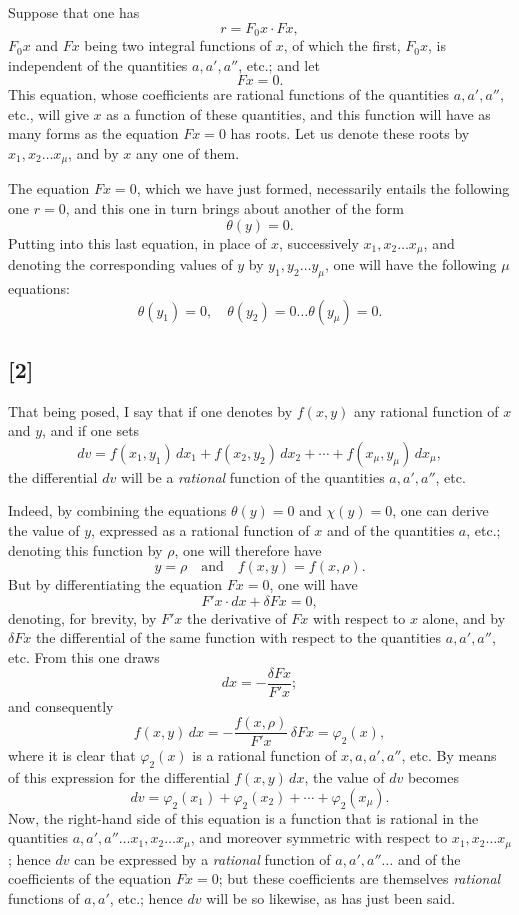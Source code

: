 \documentclass{article}
\begin{document}
Suppose that one has
\[ r = F_{0} x \cdot F x, \tag{4} \]
$F_0 x$ and $F x$ being two integral functions of $x$, of which the first, $F_0 x$, is independent of the quantities $a, a', a''$, etc.; and let
\[ F x = 0. \tag{5} \]
This equation, whose coefficients are rational functions of the quantities $a, a', a''$, etc., will give $x$ as a function of these quantities, and this function will have as many forms as the equation $F x = 0$ has roots. Let us denote these roots by $x_1, x_2 \ldots x_\mu$, and by $x$ any one of them.

The equation $F x = 0$, which we have just formed, necessarily entails the following one $r = 0$, and this one in turn brings about another of the form
\[ \theta(y) = 0. \tag{6} \]
Putting into this last equation, in place of $x$, successively $x_1, x_2 \ldots x_\mu$, and denoting the corresponding values of $y$ by $y_1, y_2 \ldots y_\mu$, one will have the following $\mu$ equations:
\[ \theta(y_1) = 0, \quad \theta(y_2) = 0 \ldots \theta(y_\mu) = 0. \tag{7} \]
\subsection*{[2]}

That being posed, I say that if one denotes by $f(x, y)$ any rational function of $x$ and $y$, and if one sets
\[ dv = f(x_1, y_1)\,dx_1 + f(x_2, y_2)\,dx_2 + \cdots + f(x_\mu, y_\mu)\,dx_\mu, \tag{8} \]
the differential $dv$ will be a \emph{rational} function of the quantities $a, a', a''$, etc.

Indeed, by combining the equations $\theta(y) = 0$ and $\chi(y) = 0$, one can derive the value of $y$, expressed as a rational function of $x$ and of the quantities $a$, etc.; denoting this function by $\rho$, one will therefore have
\[ y = \rho \quad \text{and} \quad f(x, y) = f(x, \rho). \tag{9} \]
But by differentiating the equation $F x = 0$, one will have
\[ F' x \cdot dx + \delta F x = 0, \]
denoting, for brevity, by $F' x$ the derivative of $F x$ with respect to $x$ alone, and by $\delta F x$ the differential of the same function with respect to the quantities $a, a', a''$, etc. From this one draws
\[ dx = -\frac{\delta F x}{F' x}; \tag{10} \]
and consequently
\[ f(x, y)\,dx = -\frac{f(x, \rho)}{F' x}\,\delta F x = \varphi_2(x), \tag{11} \]
where it is clear that $\varphi_2(x)$ is a rational function of $x, a, a', a''$, etc. By means of this expression for the differential $f(x, y)\,dx$, the value of $dv$ becomes
\[ dv = \varphi_2(x_1) + \varphi_2(x_2) + \cdots + \varphi_2(x_\mu). \]
Now, the right-hand side of this equation is a function
that is rational in the quantities $a, a', a'' \ldots x_1, x_2 \ldots x_\mu$, and moreover symmetric with respect to $x_1, x_2 \ldots x_\mu$; hence $dv$ can be expressed by a \emph{rational} function of $a, a', a'' \ldots$ and of the coefficients of the equation $F x = 0$; but these coefficients are themselves \emph{rational} functions of $a, a'$, etc.; hence $dv$ will be so likewise, as has just been said.
\end{document}
